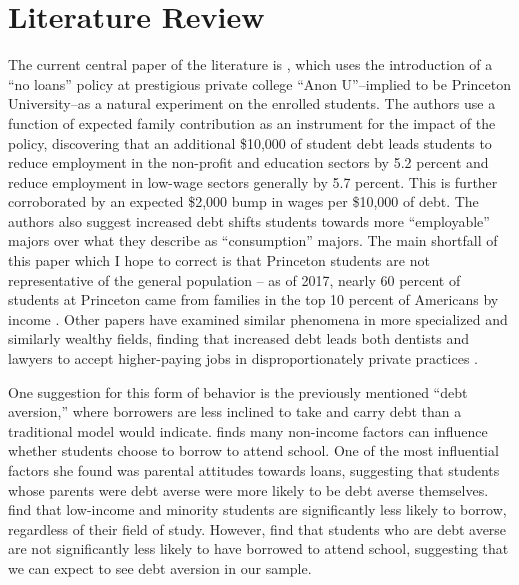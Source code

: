 \documentclass[12pt]{article}
\begin{document}
	\section{Literature Review}
	
	The current central paper of the literature is \textcite{rothstein2011}, which uses the introduction of a ``no loans'' policy at prestigious private college ``Anon U''--implied to be Princeton University--as a natural experiment on the enrolled students. The authors use a function of expected family contribution as an instrument for the impact of the policy, discovering that an additional \$10,000 of student debt leads students to reduce employment in the non-profit and education sectors by 5.2 percent and reduce employment in low-wage sectors generally by 5.7 percent. This is further corroborated by an expected \$2,000 bump in wages per \$10,000 of debt. The authors also suggest increased debt shifts students towards more ``employable'' majors over what they describe as ``consumption'' majors. The main shortfall of this paper which I hope to correct is that Princeton students are not representative of the general population -- as of 2017, nearly 60 percent of students at Princeton came from families in the top 10 percent of Americans by income \parencite{aisch2017}. Other papers have examined similar phenomena in more specialized and similarly wealthy fields, finding that increased debt leads both dentists and lawyers to accept higher-paying jobs in disproportionately private practices \parencite{nicholson2015, field2009}.
	
	One suggestion for this form of behavior is the previously mentioned ``debt aversion,'' where borrowers are less inclined to take and carry debt than a traditional model would indicate. \textcite{burdman2005} finds many non-income factors can influence whether students choose to borrow to attend school. One of the most influential factors she found was parental attitudes towards loans, suggesting that students whose parents were debt averse were more likely to be debt averse themselves. \textcite{callender2005} find that low-income and minority students are significantly less likely to borrow, regardless of their field of study. However, \textcite{eckel2007} find that students who are debt averse are not significantly less likely to have borrowed to attend school, suggesting that we can expect to see debt aversion in our sample. 
	
\end{document}
